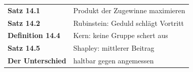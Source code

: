 \begin{merksatz}
\begin{center}
\renewcommand{\arraystretch}{1.5}
\begin{tabular}{@{}P{3.0cm}P{5.6cm}@{}}
\toprule
\textbf{Satz 14.1} & Produkt der Zugewinne maximieren\\
\textbf{Satz 14.2} & Rubinstein: Geduld schlägt Vortritt\\
\textbf{Definition 14.4} & Kern: keine Gruppe schert aus\\
\textbf{Satz 14.5} & Shapley: mittlerer Beitrag\\
\textbf{Der Unterschied} & haltbar gegen angemessen\\
\bottomrule
\end{tabular}
\end{center}

\begin{center}
\begin{minipage}{0.88\textwidth}
\end{minipage}
\end{center}
\end{merksatz}
